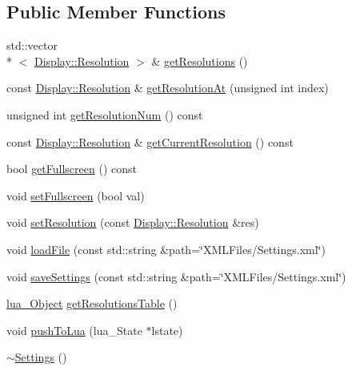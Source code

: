 \subsection*{Public Member Functions}
\begin{DoxyCompactItemize}
\item 
std\+::vector\\*
$<$ \hyperlink{classZeta_1_1Display_1_1Resolution}{Display\+::\+Resolution} $>$ \& \hyperlink{classZeta_1_1Settings_afaa9addd4769a11e2de305b16d011829}{get\+Resolutions} ()
\item 
const \hyperlink{classZeta_1_1Display_1_1Resolution}{Display\+::\+Resolution} \& \hyperlink{classZeta_1_1Settings_a7f9fde9e7657abde359a20db22ba6b1b}{get\+Resolution\+At} (unsigned int index)
\item 
unsigned int \hyperlink{classZeta_1_1Settings_a3a2607406227c4380bd99cf0b6dd206a}{get\+Resolution\+Num} () const 
\item 
const \hyperlink{classZeta_1_1Display_1_1Resolution}{Display\+::\+Resolution} \& \hyperlink{classZeta_1_1Settings_a291c862b740824716b3700a63e0b9b44}{get\+Current\+Resolution} () const 
\item 
bool \hyperlink{classZeta_1_1Settings_a693742f95d2c7a38ee555aab7c05b2de}{get\+Fullscreen} () const 
\item 
void \hyperlink{classZeta_1_1Settings_a06acd4f0308e6eb168e9a9f7124de9ec}{set\+Fullscreen} (bool val)
\item 
void \hyperlink{classZeta_1_1Settings_ab0eec21fdf77d6a2b8a9fb10b6483423}{set\+Resolution} (const \hyperlink{classZeta_1_1Display_1_1Resolution}{Display\+::\+Resolution} \&res)
\item 
void \hyperlink{classZeta_1_1Settings_afd63482656e1b4101be17f16674059da}{load\+File} (const std\+::string \&path=\char`\"{}X\+M\+L\+Files/Settings.\+xml\char`\"{})
\item 
void \hyperlink{classZeta_1_1Settings_a6b4363ae09e449958db4e5f9b73a268c}{save\+Settings} (const std\+::string \&path=\char`\"{}X\+M\+L\+Files/Settings.\+xml\char`\"{})
\item 
\hyperlink{ZetaConfig_8hpp_ae7be32b73848041a60f2412f72bbb221}{lua\+\_\+\+Object} \hyperlink{classZeta_1_1Settings_abf5bb2f29ba4c1d4e481760bfaea1c04}{get\+Resolutions\+Table} ()
\item 
void \hyperlink{classZeta_1_1Settings_a6faac6b9ffa5772039b0dc642da8997d}{push\+To\+Lua} (lua\+\_\+\+State $\ast$lstate)
\item 
\hyperlink{classZeta_1_1Settings_ab5edf939940b07192d2564cce53e5095}{$\sim$\+Settings} ()
\end{DoxyCompactItemize}
